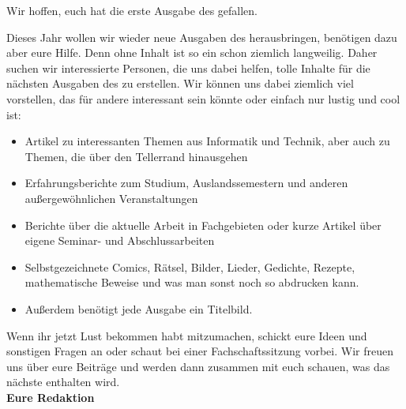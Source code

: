 Wir hoffen, euch hat die erste Ausgabe des \nameit \space gefallen.

Dieses Jahr wollen wir wieder neue Ausgaben des \nameit \space herausbringen, benötigen dazu aber eure Hilfe. Denn ohne Inhalt ist so ein \nameit \space schon ziemlich langweilig. Daher suchen wir interessierte Personen, die uns dabei helfen, tolle Inhalte für die nächsten Ausgaben des \nameit \space zu erstellen. Wir können uns dabei ziemlich viel vorstellen, das für andere interessant sein könnte oder einfach nur lustig und cool ist:

\begin{itemize}
	\item Artikel zu interessanten Themen aus Informatik und Technik, aber auch zu Themen, die über den Tellerrand hinausgehen
	\item Erfahrungsberichte zum Studium, Auslandssemestern und anderen außergewöhnlichen Veranstaltungen
	\item Berichte über die aktuelle Arbeit in Fachgebieten oder kurze Artikel über eigene Seminar- und Abschlussarbeiten
	\item Selbstgezeichnete Comics, Rätsel, Bilder, Lieder, Gedichte, Rezepte, mathematische Beweise und was man sonst noch so abdrucken kann.
	\item Außerdem benötigt jede Ausgabe ein Titelbild.
\end{itemize}

Wenn ihr jetzt Lust bekommen habt mitzumachen, schickt eure Ideen und sonstigen Fragen an  oder schaut bei einer Fachschaftssitzung vorbei. Wir freuen uns über eure Beiträge und werden dann zusammen mit euch schauen, was das nächste \nameit \space enthalten wird.\\

\large
\textbf{Eure \name \space Redaktion}
\normalsize